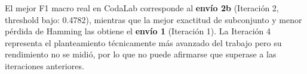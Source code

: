 \documentclass[11pt, a4paper]{article}
\begin{document}
El mejor F1 macro real en CodaLab corresponde al \textbf{envío 2b} (Iteración 2, threshold bajo: 0.4782), mientras que la mejor exactitud de subconjunto y menor pérdida de Hamming las obtiene el \textbf{envío 1} (Iteración 1). La Iteración 4 representa el planteamiento técnicamente más avanzado del trabajo pero su rendimiento no se midió, por lo que no puede afirmarse que superase a las iteraciones anteriores.
\end{document}
